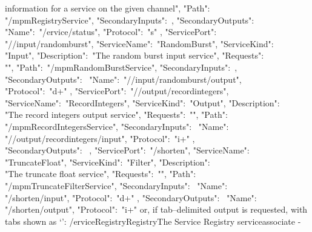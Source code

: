 information for a service on the given channel", "Path":\ \\
"\textellipsis/mpmRegistryService", "SecondaryInputs":\ \sqPair, "SecondaryOutputs":\
\openSq{} \textbraceleft\\
"Name":\ "/\textdollar{}ervice/status", "Protocol":\ "s" \textbraceright{} \closeSq{}
\textbraceright, \textbraceleft{} "ServicePort":\ \\
"/\serviceName/input/randomburst", "ServiceName":\ "RandomBurst", "ServiceKind":\ \\
"Input", "Description":\ "The random burst input service", "Requests":\ \\
"", "Path":\ "\textellipsis/mpmRandomBurstService", "SecondaryInputs":\ \sqPair,\\
"SecondaryOutputs":\ \openSq{} \textbraceleft{} "Name":\ 
"/\serviceName/input/randomburst/output",\\
"Protocol":\ "d+" \textbraceright{} \closeSq{} \textbraceright, \textbraceleft{} "ServicePort":\ 
"/\serviceName/output/recordintegers",\\
"ServiceName":\ "RecordIntegers", "ServiceKind":\ "Output", "Description":\ \\
"The record integers output service", "Requests":\ "", "Path":\ \\
"\textellipsis/mpmRecordIntegersService", "SecondaryInputs":\ \openSq{} \textbraceleft{}
"Name":\ \\
"/\serviceName/output/recordintegers/input", "Protocol":\ "i+" \textbraceright{} %
\closeSq,\\
"SecondaryOutputs":\ \sqPair{} \textbraceright, \textbraceleft{} "ServicePort":\ 
"/shorten", "ServiceName":\ \\
"TruncateFloat", "ServiceKind":\ "Filter", "Description":\ \\
"The truncate float service", "Requests":\ "", "Path":\ \\
"\textellipsis/mpmTruncateFilterService", "SecondaryInputs":\ \openSq{} \textbraceleft{}
"Name":\ \\
"/shorten/input", "Protocol":\ "d+" \textbraceright{} \closeSq, "SecondaryOutputs":\ 
\openSq{} \textbraceleft{} "Name":\ \\
"/shorten/output", "Protocol":\ "i+" \textbraceright{} \closeSq{} \textbraceright{}
\closeSq \outputEnd{}
or, if tab--delimited output is requested, with tabs shown as
`\texttt{\boldmath{$\vdash$}}':
\outputBegin{}
/\textdollar{}ervice\pseudotab{}Registry\pseudotab{}Registry\pseudotab{}The Service
Registry service\pseudotab{}associate - \\
